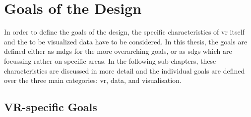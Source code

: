 \section{Goals of the Design}

In order to define the goals of the design, the specific characteristics of \gls{vr} itself and the to be visualized data have to be considered. In this thesis, the goals are defined either as \glspl{mdg} for the more overarching goals, or as \glspl{sdg} which are focussing rather on specific areas. In the following sub-chapters, these characteristics are discussed in more detail and the individual goals are defined over the three main categories: \gls{vr}, data, and visualisation.

\subsection{VR-specific Goals}


